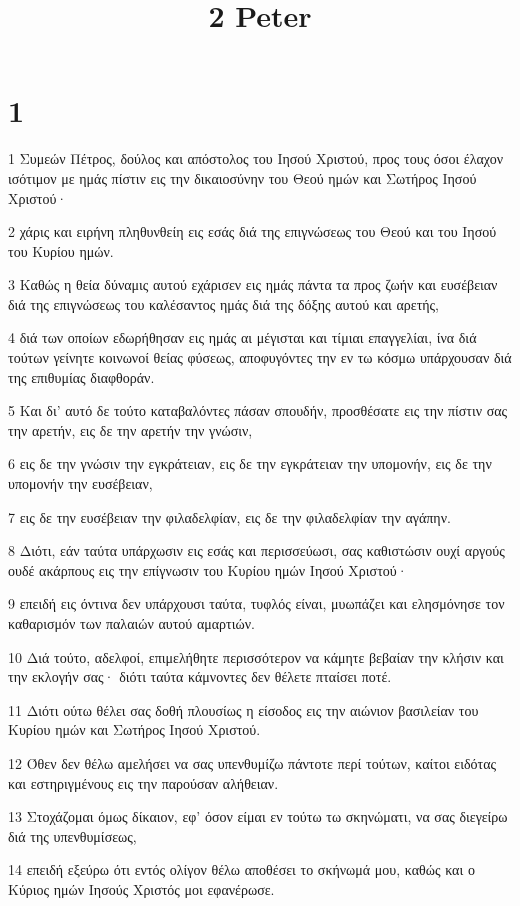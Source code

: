 

\title{2 Peter}


\chapter{1}

\par 1 Συμεών Πέτρος, δούλος και απόστολος του Ιησού Χριστού, προς τους όσοι έλαχον ισότιμον με ημάς πίστιν εις την δικαιοσύνην του Θεού ημών και Σωτήρος Ιησού Χριστού·
\par 2 χάρις και ειρήνη πληθυνθείη εις εσάς διά της επιγνώσεως του Θεού και του Ιησού του Κυρίου ημών.
\par 3 Καθώς η θεία δύναμις αυτού εχάρισεν εις ημάς πάντα τα προς ζωήν και ευσέβειαν διά της επιγνώσεως του καλέσαντος ημάς διά της δόξης αυτού και αρετής,
\par 4 διά των οποίων εδωρήθησαν εις ημάς αι μέγισται και τίμιαι επαγγελίαι, ίνα διά τούτων γείνητε κοινωνοί θείας φύσεως, αποφυγόντες την εν τω κόσμω υπάρχουσαν διά της επιθυμίας διαφθοράν.
\par 5 Και δι' αυτό δε τούτο καταβαλόντες πάσαν σπουδήν, προσθέσατε εις την πίστιν σας την αρετήν, εις δε την αρετήν την γνώσιν,
\par 6 εις δε την γνώσιν την εγκράτειαν, εις δε την εγκράτειαν την υπομονήν, εις δε την υπομονήν την ευσέβειαν,
\par 7 εις δε την ευσέβειαν την φιλαδελφίαν, εις δε την φιλαδελφίαν την αγάπην.
\par 8 Διότι, εάν ταύτα υπάρχωσιν εις εσάς και περισσεύωσι, σας καθιστώσιν ουχί αργούς ουδέ ακάρπους εις την επίγνωσιν του Κυρίου ημών Ιησού Χριστού·
\par 9 επειδή εις όντινα δεν υπάρχουσι ταύτα, τυφλός είναι, μυωπάζει και ελησμόνησε τον καθαρισμόν των παλαιών αυτού αμαρτιών.
\par 10 Διά τούτο, αδελφοί, επιμελήθητε περισσότερον να κάμητε βεβαίαν την κλήσιν και την εκλογήν σας· διότι ταύτα κάμνοντες δεν θέλετε πταίσει ποτέ.
\par 11 Διότι ούτω θέλει σας δοθή πλουσίως η είσοδος εις την αιώνιον βασιλείαν του Κυρίου ημών και Σωτήρος Ιησού Χριστού.
\par 12 Όθεν δεν θέλω αμελήσει να σας υπενθυμίζω πάντοτε περί τούτων, καίτοι ειδότας και εστηριγμένους εις την παρούσαν αλήθειαν.
\par 13 Στοχάζομαι όμως δίκαιον, εφ' όσον είμαι εν τούτω τω σκηνώματι, να σας διεγείρω διά της υπενθυμίσεως,
\par 14 επειδή εξεύρω ότι εντός ολίγον θέλω αποθέσει το σκήνωμά μου, καθώς και ο Κύριος ημών Ιησούς Χριστός μοι εφανέρωσε.
